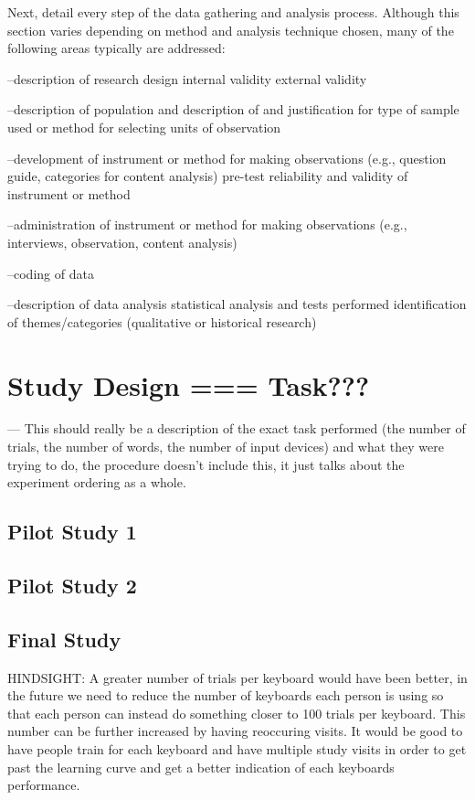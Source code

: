  Next, detail every step of the data gathering and analysis process. Although this section varies depending
on method and analysis technique chosen, many of the following areas typically are addressed:

--description of research design
 internal validity
 external validity

--description of population and description of and justification for type of sample used or method for
selecting units of observation

--development of instrument or method for making observations (e.g., question guide, categories for content
analysis)
 pre-test
 reliability and validity of instrument or method

--administration of instrument or method for making observations (e.g., interviews, observation, content
analysis)

--coding of data

--description of data analysis
 statistical analysis and tests performed
 identification of themes/categories (qualitative or historical research) 

\section{Study Design === Task???}

--- This should really be a description of the exact task performed (the number of trials, the number of words, the number of input devices) and what they were trying to do, the procedure doesn't include this, it just talks about the experiment ordering as a whole.

\subsection{Pilot Study 1}

\subsection{Pilot Study 2}

\subsection{Final Study}

HINDSIGHT:
A greater number of trials per keyboard would have been better, in the future we need to reduce the number of keyboards each person is using so that each person can instead do something closer to 100 trials per keyboard. This number can be further increased by having reoccuring visits. It would be good to have people train for each keyboard and have multiple study visits in order to get past the learning curve and get a better indication of each keyboards performance.

